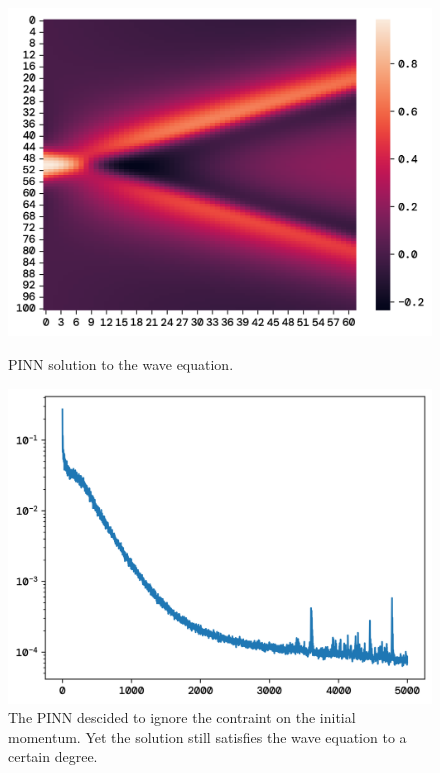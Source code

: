 \documentclass[twoside,11pt]{report}
\begin{document}
    \begin{figure}[!ht]
        \begin{minipage}[t]{0.5\textwidth - 1mm}
            \begin{center}
                \includegraphics[width=\textwidth]{../runsAndFigures/wave_tf_pinn.png}
            \end{center}
            \caption
            {
                PINN solution to the wave equation.
            }\label{fig:wave_own_dnn}
        \end{minipage}
        \hspace{2mm}
        \begin{minipage}[t]{0.5\textwidth - 1mm}
            \begin{center}
                \includegraphics[width=\textwidth]{../runsAndFigures/wave_tf_pinn_loss.png}
            \end{center}
            \caption
            {
                The PINN descided to ignore the contraint on the initial momentum. Yet the solution still satisfies the
                wave equation to a certain degree.
            }\label{fig:wave_tf_dnn}
        \end{minipage}
    \end{figure}
\end{document}
